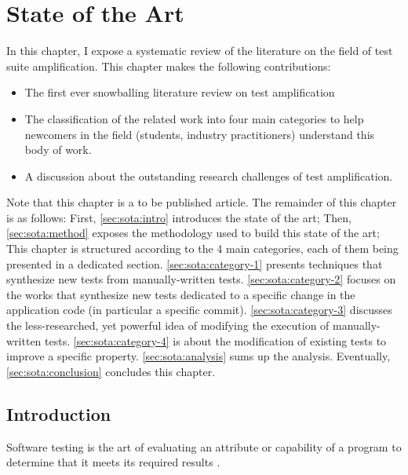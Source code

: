 \chapter{State of the Art}
\label{chap:sota}

\begin{chaptersummary}
	In this chapter, I expose a systematic review of the literature on the field of test suite amplification.
	This chapter makes the following contributions:
	\begin{itemize}
		\item The first ever snowballing literature review on test amplification
		\item The classification of the related work into four main categories to help newcomers in the field  (students, industry practitioners)  understand this body of work.
		\item A discussion about the outstanding research challenges of test amplification.
	\end{itemize}
	Note that this chapter is a to be published article\cite{survey:amplification}.
	The remainder of this chapter is as follows:
	First, \autoref{sec:sota:intro} introduces the state of the art;
	Then, \autoref{sec:sota:method}  exposes the methodology used to build this state of the art;
	This chapter is structured according to the 4 main categories, each of them being presented in a dedicated section.
	\autoref{sec:sota:category-1} presents techniques that synthesize new tests from manually-written tests.
	\autoref{sec:sota:category-2} focuses on the works that synthesize new tests dedicated to a specific change in the application code (in particular a specific commit).
	\autoref{sec:sota:category-3} discusses the less-researched, yet powerful idea of modifying the execution of manually-written tests. 
	\autoref{sec:sota:category-4} is about the modification of existing tests to improve a specific property.
	\autoref{sec:sota:analysis} sums up the analysis.
	Eventually, \autoref{sec:sota:conclusion} concludes this chapter.
\end{chaptersummary}

\minitoc

\graphicspath{{.}{chapitres/state-of-the-art/}}

\section{Introduction}
\label{sec:sota:intro}

Software testing is the art of evaluating an attribute or capability of a program to determine that it meets its required results \cite{hetzel1988}. 

